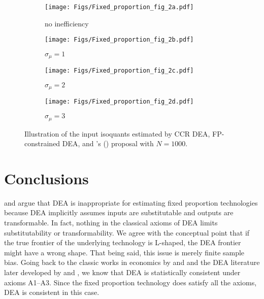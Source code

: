 {\begin{figure}[H]
	\centering
	\begin{subfigure}[b]{0.49\textwidth}
		\centering
		\texttt{[image: Figs/Fixed\_proportion\_fig\_2a.pdf]} 
		\caption[Network2]		{{\small no inefficiency}}    
		\label{fig1000:a}
	\end{subfigure}
	\begin{subfigure}[b]{0.49\textwidth}  
		\centering 
		\texttt{[image: Figs/Fixed\_proportion\_fig\_2b.pdf]} 
		\caption[]		{{\small $\sigma_\mu=1$}}    
		\label{fig1000:b}
	\end{subfigure}
	\begin{subfigure}[b]{0.49\textwidth}   
		\centering 
		\texttt{[image: Figs/Fixed\_proportion\_fig\_2c.pdf]} 
		\caption[]		{{\small $\sigma_\mu=2$}}    
		\label{fig1000:c}
	\end{subfigure}
	\begin{subfigure}[b]{0.49\textwidth}   
		\centering 
		\texttt{[image: Figs/Fixed\_proportion\_fig\_2d.pdf]} 
		\caption[]		{{\small $\sigma_\mu=3$}}    
		\label{fig1000:d}
	\end{subfigure}
	\caption[]	{Illustration of the input isoquants estimated by CCR DEA, FP-constrained DEA, and \citeauthor{Barnum2011}'s (\citeyear{Barnum2011}) proposal with $N=1000$.}
	\label{fig:sample1000}
\end{figure}



\section{Conclusions}\label{sec:concl}
\textcite{Barnum2011} and \textcite{Barnum2017} argue that DEA is inappropriate for estimating fixed proportion technologies because DEA implicitly assumes inputs are substitutable and outputs are transformable. In fact, nothing in the classical axioms of DEA limits substitutability or transformability. We agree with the conceptual point that if the true frontier of the underlying technology is L-shaped, the DEA frontier might have a wrong shape. That being said, this issue is merely finite sample bias. Going back to the classic works in economics by \textcite{Koopmans1951} and \textcite{Afriat1972} and the DEA literature later developed by \textcite{Banker1993} and \textcite{simar_aspects_1996}, we know that DEA is statistically consistent under axioms A1--A3. Since the fixed proportion technology does satisfy all the axioms, DEA is consistent in this case.

}
